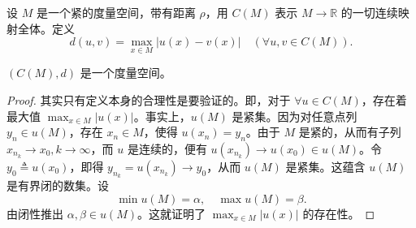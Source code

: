 \documentclass[lang=cn,newtx,10pt,scheme=chinese,thmcnt=chapter]{elegantbook}
\begin{document}
\begin{definition}[连续函数空间]
设 \( M \) 是一个紧的度量空间，带有距离 \( \rho \)，用 \( C(M) \) 表示 \( M \to \mathbb{R} \) 的一切连续映射全体。定义
\[
d(u, v) = \max_{x \in M} |u(x) - v(x)| \quad (\forall u, v \in C(M)).
\]
\end{definition}

\begin{proposition}
\((C(M), d)\) 是一个度量空间。
\end{proposition}
\begin{proof}
其实只有定义本身的合理性是要验证的。即，对于 \( \forall u \in C(M) \)，存在着最大值 \( \max_{x \in M} |u(x)| \)。事实上，\( u(M) \) 是紧集。因为对任意点列 \( y_n \in u(M) \)，存在 \( x_n \in M \)，使得 \( u(x_n) = y_n \)。由于 \( M \) 是紧的，从而有子列 \( x_{n_k} \to x_0, k \to \infty \)，而 \( u \) 是连续的，便有 \( u(x_{n_k}) \to u(x_0) \in u(M) \)。令 \( y_0 \triangleq u(x_0) \)，即得 \( y_{n_k} = u(x_{n_k}) \to y_0 \)，从而 \( u(M) \) 是紧集。这蕴含 \( u(M) \) 是有界闭的数集。设
\[
\min u(M) = \alpha, \quad \max u(M) = \beta.
\]
由闭性推出 \( \alpha, \beta \in u(M) \)。这就证明了 \( \max_{x \in M} |u(x)| \) 的存在性。
\end{proof}
\end{document}

